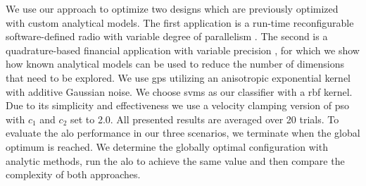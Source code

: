\documentclass[runningheads,a4paper]{llncs}
\begin{document}
We use our approach to optimize two designs which are previously optimized with custom analytical models. The first application is a run-time reconfigurable software-defined radio with variable degree of parallelism \cite{Becker:2009:PDR:1530588.1530595}. The second is a quadrature-based financial application with variable precision \cite{Anson2012Quad}, for which we show how known analytical models can be used to reduce the number of dimensions that need to be explored. We use \acp{gp} utilizing an anisotropic exponential kernel with additive Gaussian noise. We choose \acp{svm} as our classifier with a \ac{rbf} kernel. Due to its simplicity and effectiveness we use a velocity clamping version of \ac{pso} with $c_1$ and $c_2$ set to 2.0. All presented results are averaged over 20 trials. To evaluate the \ac{alo} performance in our three scenarios, we terminate when the global optimum is reached. We determine the globally optimal configuration with analytic methods, run the \ac{alo} to achieve the same value and then compare the complexity of both approaches.



%


%
\end{document}
